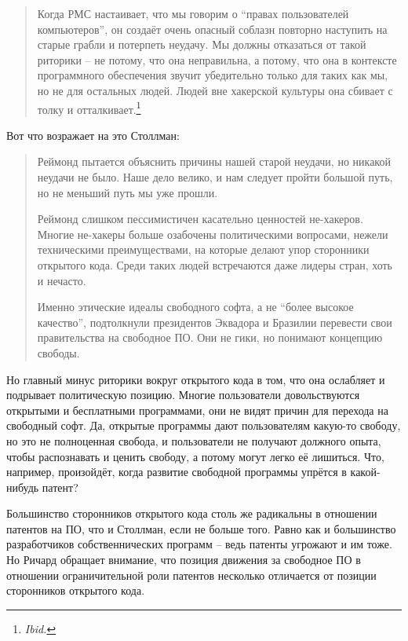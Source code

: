 \begin{quote}
Когда РМС настаивает, что мы говорим о \enquote{правах пользователей компьютеров}, он создаёт очень опасный соблазн повторно наступить на старые грабли и потерпеть неудачу. Мы должны отказаться от такой риторики -- не потому, что она неправильна, а потому, что она в контексте программного обеспечения звучит убедительно только для таких как мы, но не для остальных людей. Людей вне хакерской культуры она сбивает с толку и отталкивает.\footnote{\textit{Ibid.}}
\end{quote}

Вот что возражает на это Столлман:

\begin{quote}
Реймонд пытается объяснить причины нашей старой неудачи, но никакой неудачи не было. Наше дело велико, и нам следует пройти большой путь, но не меньший путь мы уже прошли.

Реймонд слишком пессимистичен касательно ценностей не-хакеров. Многие не-хакеры больше озабочены политическими вопросами, нежели техническими преимуществами, на которые делают упор сторонники открытого кода. Среди таких людей встречаются даже лидеры стран, хоть и нечасто.

Именно этические идеалы свободного софта, а не \enquote{более высокое качество}, подтолкнули президентов Эквадора и Бразилии перевести свои правительства на свободное ПО. Они не гики, но понимают концепцию свободы.
\end{quote}

Но главный минус риторики вокруг открытого кода в том, что она ослабляет и подрывает политическую позицию. Многие пользователи довольствуются открытыми и бесплатными программами, они не видят причин для перехода на свободный софт. Да, открытые программы дают пользователям какую-то свободу, но это не полноценная свобода, и пользователи не получают должного опыта, чтобы распознавать и ценить свободу, а потому могут легко её лишиться. Что, например, произойдёт, когда развитие свободной программы упрётся в какой-нибудь патент?

Большинство сторонников открытого кода столь же радикальны в отношении патентов на ПО, что и Столлман, если не больше того. Равно как и большинство разработчиков собственнических программ -- ведь патенты угрожают и им тоже. Но Ричард обращает внимание, что позиция движения за свободное ПО в отношении ограничительной роли патентов несколько отличается от позиции сторонников открытого кода.

